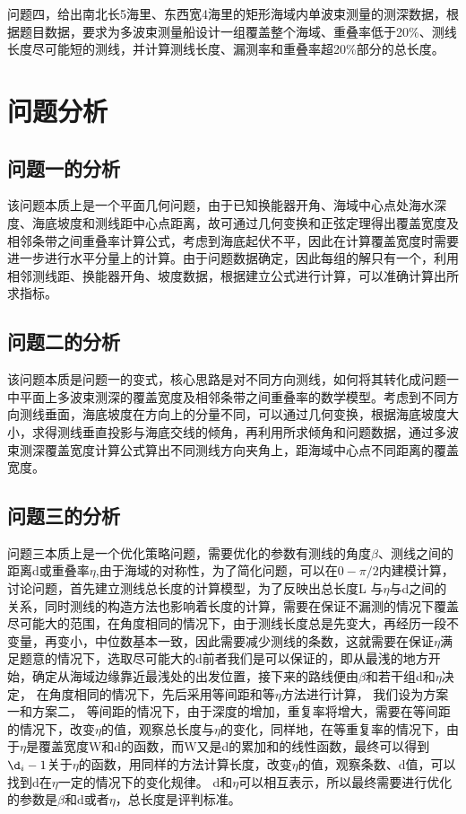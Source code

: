 \documentclass[withoutpreface,bwprint]{cumcmthesis} %
\begin{document}
问题四，给出南北长5海里、东西宽4海里的矩形海域内单波束测量的测深数据，根据题目数据，要求为多波束测量船设计一组覆盖整个海域、重叠率低于20\%、测线长度尽可能短的测线，并计算测线长度、漏测率和重叠率超20\%部分的总长度。
\section{问题分析}
\subsection{问题一的分析}
该问题本质上是一个平面几何问题，由于已知换能器开角、海域中心点处海水深度、海底坡度和测线距中心点距离，故可通过几何变换和正弦定理得出覆盖宽度及相邻条带之间重叠率计算公式，考虑到海底起伏不平，因此在计算覆盖宽度时需要进一步进行水平分量上的计算。由于问题数据确定，因此每组的解只有一个，利用相邻测线距、换能器开角、坡度数据，根据建立公式进行计算，可以准确计算出所求指标。
\subsection{问题二的分析}
该问题本质是问题一的变式，核心思路是对不同方向测线，如何将其转化成问题一中平面上多波束测深的覆盖宽度及相邻条带之间重叠率的数学模型。考虑到不同方向测线垂面，海底坡度在方向上的分量不同，可以通过几何变换，根据海底坡度大小，求得测线垂直投影与海底交线的倾角，再利用所求倾角和问题数据，通过多波束测深覆盖宽度计算公式算出不同测线方向夹角上，距海域中心点不同距离的覆盖宽度。
\subsection{问题三的分析}  
问题三本质上是一个优化策略问题，需要优化的参数有测线的角度$\beta$、测线之间的距离d或重叠率$\eta$,由于海域的对称性，为了简化问题，可以在$0-\pi/2$内建模计算，讨论问题，首先建立测线总长度的计算模型，为了反映出总长度L
与$\eta$与d之间的关系，同时测线的构造方法也影响着长度的计算，需要在保证不漏测的情况下覆盖尽可能大的范围，在角度相同的情况下，由于测线长度总是先变大，再经历一段不变量，再变小，中位数基本一致，因此需要减少测线的条数，这就需要在保证$\eta$满足题意的情况下，选取尽可能大的d前者我们是可以保证的，即从最浅的地方开始，确定从海域边缘靠近最浅处的出发位置，接下来的路线便由$\beta$和若干组d和$\eta$决定，
在角度相同的情况下，先后采用等间距和等$\eta$方法进行计算，
我们设为方案一和方案二，
等间距的情况下，由于深度的增加，重复率将增大，需要在等间距的情况下，改变$\eta$的值，观察总长度与$\eta$的变化，同样地，在等重复率的情况下，由于$\eta$是覆盖宽度W和d的函数，而W又是d的累加和的线性函数，最终可以得到$\d_i-1$关于$\eta$的函数，用同样的方法计算长度，改变$\eta$的值，观察条数、d值，可以找到d在$\eta$一定的情况下的变化规律。
d和$\eta$可以相互表示，所以最终需要进行优化的参数是$\beta$和d或者$\eta$，总长度是评判标准。
\end{document}
